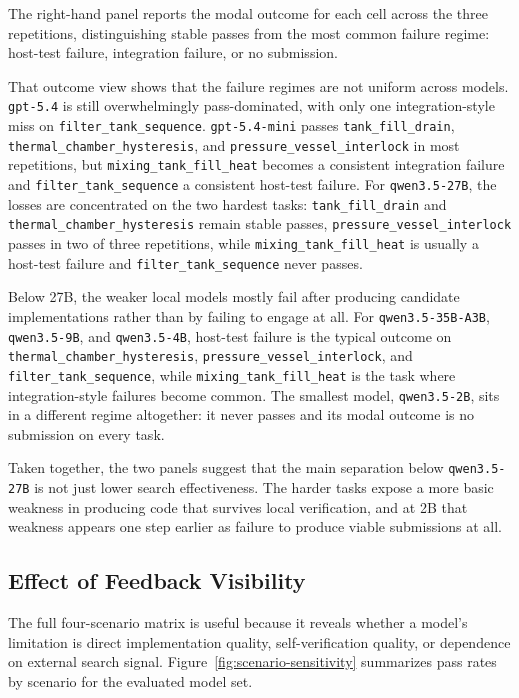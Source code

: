 \documentclass[a4paper,fleqn]{cas-dc}
\DeclareRobustCommand{\tool}[1]{\texttt{\nolinkurl{#1}}}
\begin{document}
The right-hand panel reports the modal outcome for each cell across the three repetitions, distinguishing stable passes from the most common failure regime: host-test failure, integration failure, or no submission.

That outcome view shows that the failure regimes are not uniform across models. \tool{gpt-5.4} is still overwhelmingly pass-dominated, with only one integration-style miss on \tool{filter_tank_sequence}. \tool{gpt-5.4-mini} passes \tool{tank_fill_drain}, \tool{thermal_chamber_hysteresis}, and \tool{pressure_vessel_interlock} in most repetitions, but \tool{mixing_tank_fill_heat} becomes a consistent integration failure and \tool{filter_tank_sequence} a consistent host-test failure. For \tool{qwen3.5-27B}, the losses are concentrated on the two hardest tasks: \tool{tank_fill_drain} and \tool{thermal_chamber_hysteresis} remain stable passes, \tool{pressure_vessel_interlock} passes in two of three repetitions, while \tool{mixing_tank_fill_heat} is usually a host-test failure and \tool{filter_tank_sequence} never passes.

Below 27B, the weaker local models mostly fail after producing candidate implementations rather than by failing to engage at all. For \tool{qwen3.5-35B-A3B}, \tool{qwen3.5-9B}, and \tool{qwen3.5-4B}, host-test failure is the typical outcome on \tool{thermal_chamber_hysteresis}, \tool{pressure_vessel_interlock}, and \tool{filter_tank_sequence}, while \tool{mixing_tank_fill_heat} is the task where integration-style failures become common. The smallest model, \tool{qwen3.5-2B}, sits in a different regime altogether: it never passes and its modal outcome is no submission on every task.

Taken together, the two panels suggest that the main separation below \tool{qwen3.5-27B} is not just lower search effectiveness. The harder tasks expose a more basic weakness in producing code that survives local verification, and at 2B that weakness appears one step earlier as failure to produce viable submissions at all.

\subsection{Effect of Feedback Visibility}

The full four-scenario matrix is useful because it reveals whether a model's limitation is direct implementation quality, self-verification quality, or dependence on external search signal. Figure~\ref{fig:scenario-sensitivity} summarizes pass rates by scenario for the evaluated model set.
\end{document}

